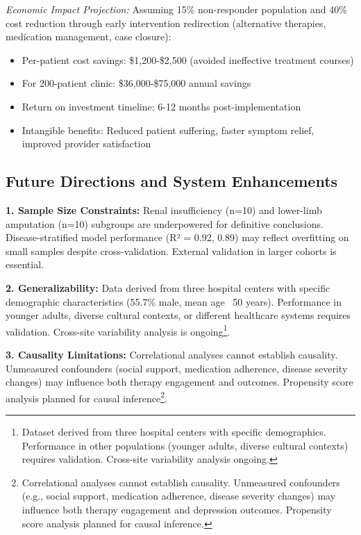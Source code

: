 \documentclass[conference]{IEEEtran}
\begin{document}
\textit{Economic Impact Projection:} Assuming 15\% non-responder population and 40\% cost reduction through early intervention redirection (alternative therapies, medication management, case closure):
\begin{itemize}
    \item Per-patient cost savings: \$1,200-\$2,500 (avoided ineffective treatment courses)
    \item For 200-patient clinic: \$36,000-\$75,000 annual savings
    \item Return on investment timeline: 6-12 months post-implementation
    \item Intangible benefits: Reduced patient suffering, faster symptom relief, improved provider satisfaction
\end{itemize}

\subsection{Future Directions and System Enhancements}

\textbf{1. Sample Size Constraints:} Renal insufficiency (n=10) and lower-limb amputation (n=10) subgroups are underpowered for definitive conclusions. Disease-stratified model performance (R² = 0.92, 0.89) may reflect overfitting on small samples despite cross-validation. External validation in larger cohorts is essential.

\textbf{2. Generalizability:} Data derived from three hospital centers with specific demographic characteristics (55.7\% male, mean age ~50 years). Performance in younger adults, diverse cultural contexts, or different healthcare systems requires validation. Cross-site variability analysis is ongoing\footnote{Dataset derived from three hospital centers with specific demographics. Performance in other populations (younger adults, diverse cultural contexts) requires validation. Cross-site variability analysis ongoing.}.

\textbf{3. Causality Limitations:} Correlational analyses cannot establish causality. Unmeasured confounders (social support, medication adherence, disease severity changes) may influence both therapy engagement and outcomes. Propensity score analysis planned for causal inference\footnote{Correlational analyses cannot establish causality. Unmeasured confounders (e.g., social support, medication adherence, disease severity changes) may influence both therapy engagement and depression outcomes. Propensity score analysis planned for causal inference.}.
\end{document}
